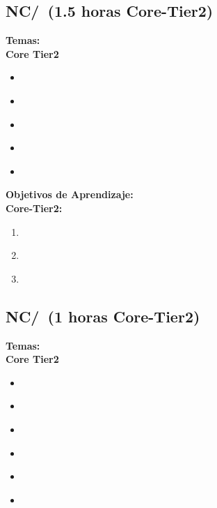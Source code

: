 \subsection{NC/\NCLocalAreaNetworks~(1.5 horas Core-Tier2)}\label{sec:BOK:NCLocalAreaNetworks}
\noindent \textbf{Temas:}\\
\noindent \textbf{Core Tier2}
\begin{itemize}
	\item \NCLocalAreaNetworksTopicMultiple\label{sec:BOK:NCLocalAreaNetworksTopicMultiple}
	\item \NCLocalAreaNetworksTopicCommon\label{sec:BOK:NCLocalAreaNetworksTopicCommon}
	\item \NCLocalAreaNetworksTopicLocal\label{sec:BOK:NCLocalAreaNetworksTopicLocal}
	\item \NCLocalAreaNetworksTopicEthernet\label{sec:BOK:NCLocalAreaNetworksTopicEthernet}
	\item \NCLocalAreaNetworksTopicSwitching\label{sec:BOK:NCLocalAreaNetworksTopicSwitching}
\end{itemize}


\noindent \textbf{Objetivos de Aprendizaje:}\\
\noindent \textbf{Core-Tier2:}
\begin{enumerate}
	\setcounter{enumi}{0}
	\item \NCLocalAreaNetworksLODescribeHowForwardedEthernet\xspace[\NCLocalAreaNetworksLODescribeHowForwardedEthernetLevel]\label{sec:BOK:NCLocalAreaNetworksLODescribeHowForwardedEthernet}
	\item \NCLocalAreaNetworksLODescribeTheIp\xspace[\NCLocalAreaNetworksLODescribeTheIpLevel]\label{sec:BOK:NCLocalAreaNetworksLODescribeTheIp}
	\item \NCLocalAreaNetworksLODescribeTheIn\xspace[\NCLocalAreaNetworksLODescribeTheInLevel]\label{sec:BOK:NCLocalAreaNetworksLODescribeTheIn}
\end{enumerate}


\subsection{NC/\NCResourceAllocation~(1 horas Core-Tier2)}\label{sec:BOK:NCResourceAllocation}
\noindent \textbf{Temas:}\\
\noindent \textbf{Core Tier2}
\begin{itemize}
	\item \NCResourceAllocationTopicNeed\label{sec:BOK:NCResourceAllocationTopicNeed}
	\item \NCResourceAllocationTopicFixed\label{sec:BOK:NCResourceAllocationTopicFixed}
	\item \NCResourceAllocationTopicEnd\label{sec:BOK:NCResourceAllocationTopicEnd}
	\item \NCResourceAllocationTopicFairness\label{sec:BOK:NCResourceAllocationTopicFairness}
	\item \NCResourceAllocationTopicPrinciples\label{sec:BOK:NCResourceAllocationTopicPrinciples}
	\item \NCResourceAllocationTopicApproaches\label{sec:BOK:NCResourceAllocationTopicApproaches}
\end{itemize}


